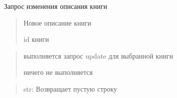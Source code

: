 \documentclass[letterpaper,10pt,russian]{sphinxmanual}
\begin{document}
\begin{fulllineitems}
\label{\detokenize{blueprints:blueprints.change_book_information.change_description}}
\pysigstartsignatures
{}
\pysigstopsignatures
\sphinxAtStartPar
Запрос изменения описания книги
\begin{description}
\begin{quote}\begin{description}
\sphinxAtStartPar
Новое описание книги

\sphinxAtStartPar
id книги

\end{description}\end{quote}

\begin{quote}\begin{description}
\sphinxAtStartPar
выполняется запрос update для выбранной книги

\sphinxAtStartPar
ничего не выполняется

\end{description}\end{quote}

\end{description}
\begin{quote}\begin{description}
\sphinxAtStartPar
str: Возвращает пустую строку

\end{description}\end{quote}

\end{fulllineitems}

\end{document}
